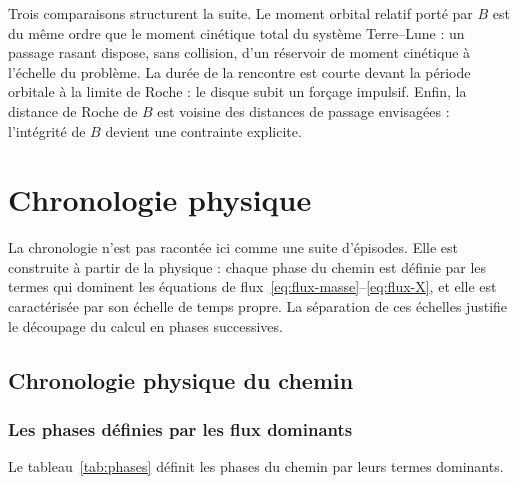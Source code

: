 \documentclass[11pt,a4paper,openany]{report}
\begin{document}
\begin{controle}
Trois comparaisons structurent la suite. Le moment orbital relatif porté par $B$ est du même
ordre que le moment cinétique total du système Terre--Lune : un passage rasant dispose, sans
collision, d'un réservoir de moment cinétique à l'échelle du problème. La durée de la rencontre
est courte devant la période orbitale à la limite de Roche : le disque subit un forçage
impulsif. Enfin, la distance de Roche de $B$ est voisine des distances de passage envisagées :
l'intégrité de $B$ devient une contrainte explicite.
\end{controle}
\part{Chronologie physique}
\label{part:chronologie}

\noindent
La chronologie n'est pas racontée ici comme une suite d'épisodes. Elle est construite à partir de
la physique : chaque phase du chemin est définie par les termes qui dominent les équations de
flux~\eqref{eq:flux-masse}--\eqref{eq:flux-X}, et elle est caractérisée par son échelle de temps
propre. La séparation de ces échelles justifie le découpage du calcul en phases successives.

\chapter{Chronologie physique du chemin}
\label{ch:chronologie}

\section{Les phases définies par les flux dominants}

Le tableau~\ref{tab:phases} définit les phases du chemin par leurs termes dominants.
\end{document}
